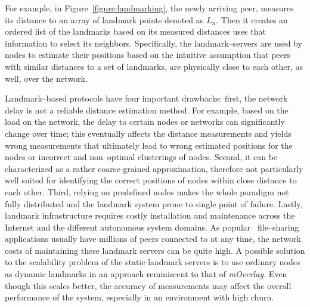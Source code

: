 For example, in Figure~\ref{figure:landmarking}, the newly
arriving peer, measures its distance to an array of landmark points denoted as
$L_n$. Then it creates an ordered list of the landmarks based on its measured
distances uses that information to select its neighbors. Specifically,
the landmark--servers are used by nodes to estimate 
their positions based on the intuitive assumption that peers
with similar distances to a set of landmarks, are physically close to each
other, as well, over the network.  

Landmark--based protocols have four important drawbacks:
first, the network delay is not a reliable distance estimation method. For
example, based on the load on the network, the delay to certain nodes or
networks can significantly change over time; this eventually affects the
distance measurements and yields wrong measurements that ultimately lead to
wrong estimated positions for the nodes or incorrect and non--optimal
clusterings of nodes.
Second, it can be characterized as a rather coarse-grained approximation,
therefore not particularly well suited for identifying the correct positions
of nodes within close distance to each other.
Third, relying on predefined nodes makes the whole paradigm not fully
distributed and the landmark system prone to single point of failure.
Lastly, landmark infrastructure requires costly installation and maintenance 
across the Internet and the different autonomous system domains. As popular
\p\ file--sharing applications usually have millions of peers connected to at
any time, the network costs of maintaining these landmark servers can be quite
high. A possible solution to the scalability problem of the static landmark
servers is to use ordinary nodes as dynamic landmarks in an approach
reminiscent to that of \emph{mOverlay}. Even though this scales better, the
accuracy of measurements may affect the overall performance of the system,
especially in an environment with high churn.




